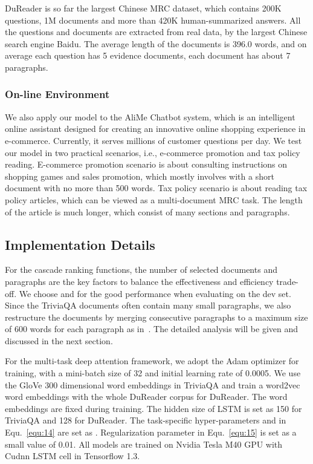 \documentclass[letterpaper]{article} \usepackage{aaai19}  \usepackage{graphicx}
\begin{document}
DuReader is so far the largest Chinese MRC dataset, which contains 200K questions, 1M documents and more than  420K human-summarized answers. All the questions and documents are extracted from real data, by the largest Chinese search engine Baidu. The average length of the documents is 396.0 words, and on average each question has 5 evidence documents, each document has about 7 paragraphs.

\subsubsection{On-line Environment}
We also apply our model to the AliMe Chatbot system, which is an intelligent online assistant designed for creating an innovative online shopping experience in e-commerce. Currently, it serves millions of customer questions per day. We test our model in two practical scenarios, i.e., e-commerce promotion and tax policy reading. E-commerce promotion scenario is about consulting instructions on shopping games and sales promotion, which mostly involves with a short document with no more than 500 words. Tax policy scenario is about reading tax policy articles, which can be viewed as a multi-document MRC task. The length of the article is much longer, which consist of many sections and paragraphs.  

\subsection{Implementation Details}
For the cascade ranking functions, the number of selected documents  and paragraphs  are the key factors to balance the effectiveness and efficiency trade-off. We choose  and  for the good performance when evaluating on the dev set. Since the TriviaQA documents often contain many small paragraphs, we also restructure the documents by merging consecutive paragraphs to a maximum size of 600 words for each paragraph as in~\cite{clark2017simple}. The detailed analysis will be given and discussed in the next section.

For the multi-task deep attention framework, we adopt the Adam optimizer for training, with a mini-batch size of 32 and initial learning rate of 0.0005. We use the GloVe 300 dimensional word embeddings in TriviaQA and train a word2vec word embeddings with the whole DuReader corpus for DuReader. The word embeddings are fixed during training. The hidden size of LSTM is set as 150 for TriviaQA and 128 for DuReader. The task-specific hyper-parameters  and  in Equ.~\ref{equ:14} are set as . Regularization parameter  in Equ.~\ref{equ:15} is set as a small value of 0.01. All models are trained on Nvidia Tesla M40 GPU with Cudnn LSTM cell in Tensorflow 1.3. 
\end{document}
